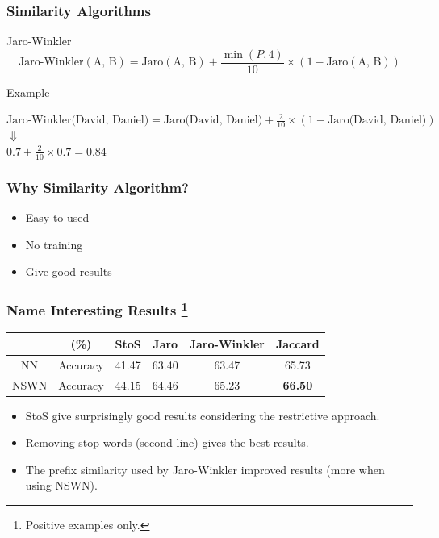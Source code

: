 \documentclass{beamer}
\begin{document}
	\begin{frame}\frametitle{Similarity Algorithms}
		\begin{block}{Jaro-Winkler}	
			\begin{equation*}
				\text{Jaro-Winkler}(\text{A, B}) = \text{Jaro}(\text{A, B}) + \frac{\min\left(P, 4\right)}{10} \times \left(1 - \text{Jaro}(\text{A, B})\right)
			\end{equation*}
		\end{block}
		\begin{block}{Example}	
			\begin{center}
				$\text{Jaro-Winkler(David, Daniel)} = \text{Jaro(David, Daniel)} + \frac{2}{10} \times  (1 - \text{Jaro(David, Daniel)})$\\ $\Downarrow$\\
				$0.7 + \frac{2}{10} \times 0.7 = 0.84$
			\end{center}
		\end{block}
	\end{frame}


	\begin{frame}\frametitle{Why Similarity Algorithm?}
		\begin{itemize}
			\item<1-> Easy to used
			\item<2-> No training
			\item<3-> Give good results
		\end{itemize}
	\end{frame}
	
	\begin{frame}\frametitle{Name Interesting Results \footnote{Positive examples only.}}
		\begin{table}[]
			\begin{tabular}{cccccc}
				\toprule
				& (\%)       & StoS   & Jaro  & Jaro-Winkler & Jaccard \\
				\midrule
				NN      & Accuracy & 41.47 & 63.40 & 63.47 & 65.73        \\
				NSWN & Accuracy & 44.15 & 64.46 & 65.23 & \textbf{66.50}    
				\\\bottomrule
			\end{tabular}
		\end{table}
		\begin{itemize}
			\item<1-> StoS give surprisingly good results considering the restrictive approach. 
			\item<2-> Removing stop words (second line) gives the best results.
			\item<3-> The prefix similarity used by Jaro-Winkler improved results (more when using NSWN).
		\end{itemize}
	\end{frame}
	
\end{document}
